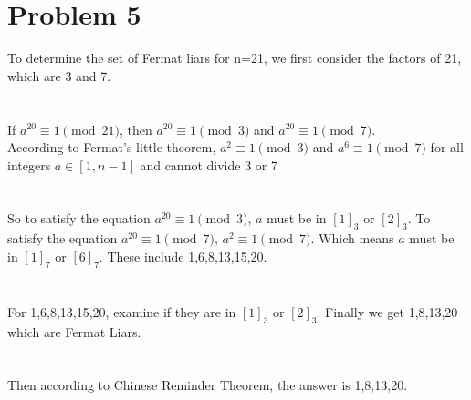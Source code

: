 \documentclass{article}
\begin{document}
\section{Problem 5}
To determine the set of Fermat liars for n=21, we first consider the factors of 21, which are 3 and 7.\\
\\ \hspace*{\fill} \\
If $a^{20} \equiv 1 \pmod{21}$, then $a^{20} \equiv 1 \pmod{3}$ and $a^{20} \equiv 1 \pmod{7}$.\\
According to Fermat's little theorem, $a^{2} \equiv 1 \pmod{3}$ and $a^{6} \equiv 1 \pmod{7}$ for all integers $a \in [1,n-1] $ and cannot divide 3 or 7\\
\\ \hspace*{\fill} \\
So to satisfy the equation $a^{20} \equiv 1 \pmod{3}$, $a$ must be in $[1]_3$ or $[2]_3$. To satisfy the equation $a^{20} \equiv 1 \pmod{7}$, $a^2 \equiv 1 \pmod{7}$. Which means $a$ must be in $[1]_7$ or $[6]_7$. These include 1,6,8,13,15,20.\\
\\ \hspace*{\fill} \\
For 1,6,8,13,15,20, examine if they are in $[1]_3$ or $[2]_3$. Finally we get 1,8,13,20 which are Fermat Liars.\\
\\ \hspace*{\fill} \\
Then according to Chinese Reminder Theorem, the answer is 1,8,13,20. \\
\end{document}
